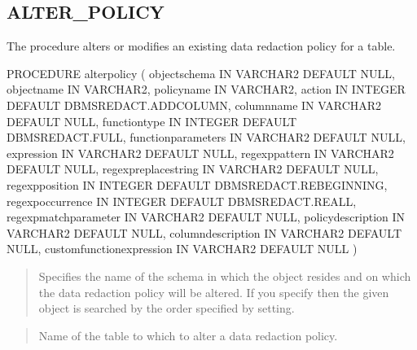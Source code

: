 \documentclass[letterpaper,10pt,english,openany,oneside]{sphinxmanual}
\begin{document}
\newpage


\subsection{ALTER\_POLICY}
\label{\detokenize{dbms_redact:alter-policy}}
The  procedure alters or modifies an existing data redaction policy for a table.

%
\begin{sphinxVerbatim}[commandchars=\\\{\}]
PROCEDURE alter\PYGZus{}policy (
object\PYGZus{}schema                          IN VARCHAR2 DEFAULT NULL,
object\PYGZus{}name                            IN VARCHAR2,
policy\PYGZus{}name                            IN VARCHAR2,
action                    IN INTEGER DEFAULT DBMS\PYGZus{}REDACT.ADD\PYGZus{}COLUMN,
column\PYGZus{}name                            IN VARCHAR2 DEFAULT NULL,
function\PYGZus{}type                          IN INTEGER DEFAULT DBMS\PYGZus{}REDACT.FULL,
function\PYGZus{}parameters              IN VARCHAR2 DEFAULT NULL,
expression                             IN VARCHAR2 DEFAULT NULL,
regexp\PYGZus{}pattern                 IN VARCHAR2 DEFAULT NULL,
regexp\PYGZus{}replace\PYGZus{}string                  IN VARCHAR2 DEFAULT NULL,
regexp\PYGZus{}position      IN INTEGER DEFAULT DBMS\PYGZus{}REDACT.RE\PYGZus{}BEGINNING,
regexp\PYGZus{}occurrence IN INTEGER DEFAULT DBMS\PYGZus{}REDACT.RE\PYGZus{}ALL,
regexp\PYGZus{}match\PYGZus{}parameter      IN VARCHAR2 DEFAULT NULL,
policy\PYGZus{}description                IN VARCHAR2 DEFAULT NULL,
column\PYGZus{}description                IN VARCHAR2 DEFAULT NULL,
custom\PYGZus{}function\PYGZus{}expression  IN VARCHAR2 DEFAULT NULL
)
\end{sphinxVerbatim}


\begin{quote}

Specifies the name of the schema in which the object resides and on
which the data redaction policy will be altered. If you specify 
then the given object is searched by the order specified by 
setting.
\end{quote}

\begin{quote}

Name of the table to which to alter a data redaction policy.
\end{quote}
\end{document}
